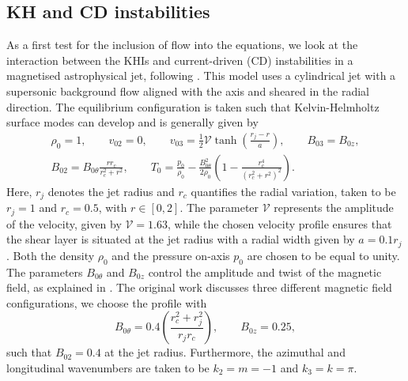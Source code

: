 \subsection{KH and CD instabilities} \label{ss: kh_cd_instabilities}
As a first test for the inclusion of flow into the equations, we look at the interaction between the KHIs and current-driven (CD) instabilities in a magnetised astrophysical jet, following \citet{baty2002}. This model uses a cylindrical jet with a supersonic background flow aligned with the axis and sheared in the radial direction. The equilibrium configuration is taken such that Kelvin-Helmholtz surface modes can develop and is generally given by
\begin{equation} \label{eq: kh_cd_equilibrium}
  \begin{gathered}
    \rho_0 = 1,
    \qquad
    v_{02} = 0,
    \qquad
    v_{03} = \frac{1}{2}\mathcal{V}\tanh\left(\frac{r_j - r}{a}\right),
    \qquad
    B_{03} = B_{0z}, \\
    B_{02} = B_{0\theta} \frac{r r_c}{r_c^2 + r^2},
    \qquad
    T_0 = \frac{p_0}{\rho_0} - \frac{B_{0\theta}^2}{2\rho_0}\left(1 - \frac{r_c^4}{\left(r_c^2 + r^2\right)^2}\right).
  \end{gathered}
\end{equation}
Here, $r_j$ denotes the jet radius and $r_c$ quantifies the radial variation, taken to be $r_j = 1$ and $r_c = 0.5$, with $r \in [0, 2]$. The parameter $\mathcal{V}$ represents the amplitude of the velocity, given by $\mathcal{V} = 1.63$, while the chosen velocity profile ensures that the shear layer is situated at the jet radius with a radial width given by $a = 0.1r_j$. Both the density $\rho_0$ and the pressure on-axis $p_0$ are chosen to be equal to unity. The parameters $B_{0\theta}$ and $B_{0z}$ control the amplitude and twist of the magnetic field, as explained in \citet{baty2002}. The original work discusses three different magnetic field configurations, we choose the profile with
\begin{equation}
  B_{0\theta} = 0.4\left(\frac{r_c^2 + r_j^2}{r_j r_c}\right),
  \qquad
  B_{0z} = 0.25,
\end{equation}
such that $B_{02} = 0.4$ at the jet radius. Furthermore, the azimuthal and longitudinal wavenumbers are taken to be $k_2 = m = -1$ and $k_3 = k = \pi$.

